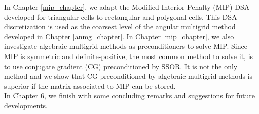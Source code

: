 \noindent In Chapter \ref{mip_chapter}, we adapt the Modified Interior 
Penalty (MIP) DSA developed for triangular cells to rectangular and polygonal 
cells. This DSA discretization is used as the coarsest level of the angular 
multigrid method developed in Chapter \ref{anmg_chapter}. In Chapter
\ref{mip_chapter}, we also investigate algebraic multigrid methods as 
preconditioners to solve MIP. Since MIP is symmetric and definite-positive, 
the most common method to solve it, is to use conjugate gradient (CG) 
preconditioned by SSOR. It is not the only method and we show that CG 
preconditioned by algebraic multigrid methods is superior if the matrix 
associated to MIP can be stored.\\

\noindent In Chapter 6, we finish with some concluding remarks and suggestions for
future developments.
